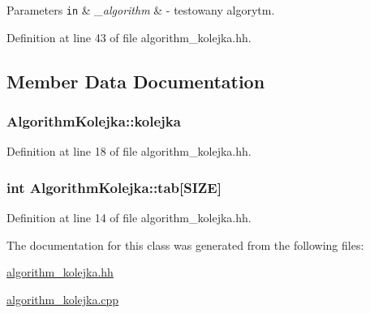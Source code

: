 \begin{DoxyParams}[1]{Parameters}
\mbox{\tt in}  & {\em \-\_\-algorithm} & -\/ testowany algorytm. \\
\hline
\end{DoxyParams}


Definition at line 43 of file algorithm\-\_\-kolejka.\-hh.



\subsection{Member Data Documentation}
\hypertarget{class_algorithm_kolejka_a49a2b654776c15b98475ce3a7491c3ed}{
\subsubsection[{kolejka}]{ Algorithm\-Kolejka\-::kolejka\hspace{0.3cm}{\ttfamily [private]}}}\label{class_algorithm_kolejka_a49a2b654776c15b98475ce3a7491c3ed}


Definition at line 18 of file algorithm\-\_\-kolejka.\-hh.

\hypertarget{class_algorithm_kolejka_a12512e397f0f154464dc42fb060fdd3e}{
\subsubsection[{tab}]{\setlength{\rightskip}{0pt plus 5cm}int Algorithm\-Kolejka\-::tab\mbox{[}{\bf S\-I\-Z\-E}\mbox{]}\hspace{0.3cm}{\ttfamily [private]}}}\label{class_algorithm_kolejka_a12512e397f0f154464dc42fb060fdd3e}


Definition at line 14 of file algorithm\-\_\-kolejka.\-hh.



The documentation for this class was generated from the following files\-:\begin{DoxyCompactItemize}
\item 
\hyperlink{algorithm__kolejka_8hh}{algorithm\-\_\-kolejka.\-hh}\item 
\hyperlink{algorithm__kolejka_8cpp}{algorithm\-\_\-kolejka.\-cpp}\end{DoxyCompactItemize}
